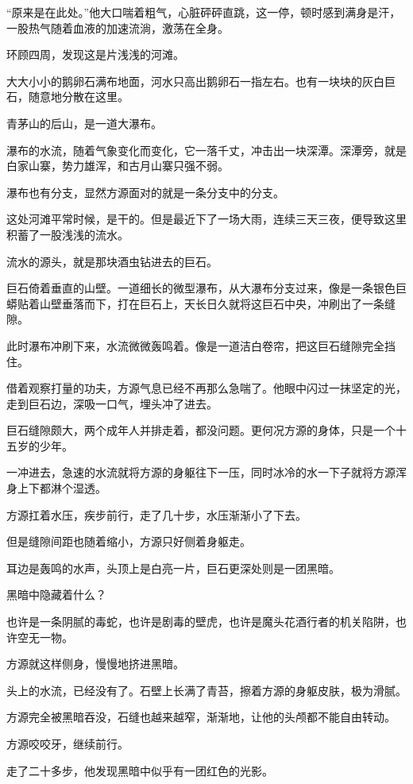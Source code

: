\begin{this_body}
“原来是在此处。”他大口喘着粗气，心脏砰砰直跳，这一停，顿时感到满身是汗，一股热气随着血液的加速流淌，激荡在全身。

环顾四周，发现这是片浅浅的河滩。

大大小小的鹅卵石满布地面，河水只高出鹅卵石一指左右。也有一块块的灰白巨石，随意地分散在这里。

青茅山的后山，是一道大瀑布。

瀑布的水流，随着气象变化而变化，它一落千丈，冲击出一块深潭。深潭旁，就是白家山寨，势力雄浑，和古月山寨只强不弱。

瀑布也有分支，显然方源面对的就是一条分支中的分支。

这处河滩平常时候，是干的。但是最近下了一场大雨，连续三天三夜，便导致这里积蓄了一股浅浅的流水。

流水的源头，就是那块酒虫钻进去的巨石。

巨石倚着垂直的山壁。一道细长的微型瀑布，从大瀑布分支过来，像是一条银色巨蟒贴着山壁垂落而下，打在巨石上，天长日久就将这巨石中央，冲刷出了一条缝隙。

此时瀑布冲刷下来，水流微微轰鸣着。像是一道洁白卷帘，把这巨石缝隙完全挡住。

借着观察打量的功夫，方源气息已经不再那么急喘了。他眼中闪过一抹坚定的光，走到巨石边，深吸一口气，埋头冲了进去。

巨石缝隙颇大，两个成年人并排走着，都没问题。更何况方源的身体，只是一个十五岁的少年。

一冲进去，急速的水流就将方源的身躯往下一压，同时冰冷的水一下子就将方源浑身上下都淋个湿透。

方源扛着水压，疾步前行，走了几十步，水压渐渐小了下去。

但是缝隙间距也随着缩小，方源只好侧着身躯走。

耳边是轰鸣的水声，头顶上是白亮一片，巨石更深处则是一团黑暗。

黑暗中隐藏着什么？

也许是一条阴腻的毒蛇，也许是剧毒的壁虎，也许是魔头花酒行者的机关陷阱，也许空无一物。

方源就这样侧身，慢慢地挤进黑暗。

头上的水流，已经没有了。石壁上长满了青苔，擦着方源的身躯皮肤，极为滑腻。

方源完全被黑暗吞没，石缝也越来越窄，渐渐地，让他的头颅都不能自由转动。

方源咬咬牙，继续前行。

走了二十多步，他发现黑暗中似乎有一团红色的光影。


\end{this_body}
